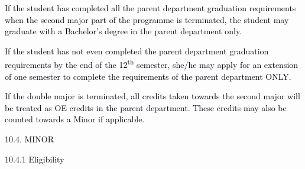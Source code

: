 \documentclass[12pt]{article}
\begin{document}
\vspace{\baselineskip}
\begin{adjustwidth}{0.25in}{0.0in}
\begin{justify}
{\fontsize{9pt}{10.8pt}\selectfont \textcolor[HTML]{00000A}{If the student has completed all the parent department graduation requirements when the second major part of the programme is terminated, the student may graduate with a Bachelor’s degree in the parent department only.}\par}
\end{justify}\par

\end{adjustwidth}


\vspace{\baselineskip}
\begin{adjustwidth}{0.25in}{0.01in}
\begin{justify}
{\fontsize{9pt}{10.8pt}\selectfont \textcolor[HTML]{00000A}{If the student has not even completed the parent department graduation requirements by the end of the 12\textsuperscript{th} semester, she/he may apply for an extension of one semester to complete the requirements of the parent department ONLY.}\par}
\end{justify}\par

\end{adjustwidth}


\vspace{\baselineskip}
\begin{adjustwidth}{0.25in}{0.0in}
\begin{justify}
{\fontsize{10pt}{12.0pt}\selectfont \textcolor[HTML]{00000A}{If the double major is terminated, all credits taken towards the second major will be treated as OE credits in the parent department. These credits may also be counted towards a Minor if applicable.}\par}
\end{justify}\par

\end{adjustwidth}


\vspace{\baselineskip}
\textcolor[HTML]{00000A}{10.4. MINOR}\par


\vspace{\baselineskip}
{\fontsize{10pt}{12.0pt}\selectfont \textcolor[HTML]{00000A}{10.4.1 Eligibility}\par}\par
\end{document}
